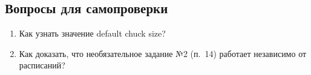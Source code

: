 \subsection{Вопросы для самопроверки}
\begin{enumerate}
    \item Как узнать значение default chuck size?
    \item Как доказать, что необязательное задание №2 (п.~14) работает независимо от расписаний?
\end{enumerate}
